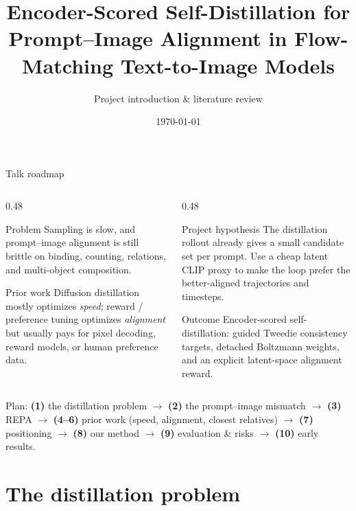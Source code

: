 \documentclass[aspectratio=169,10pt]{beamer}
\title[Encoder-Scored Self-Distillation]{Encoder-Scored Self-Distillation
  for Prompt--Image Alignment in Flow-Matching Text-to-Image Models}
\subtitle{Project introduction \& literature review}
\date{\today}
\begin{document}
\maketitle

\begin{frame}{Talk roadmap}
  \begin{columns}[T]
    \begin{column}{0.48\textwidth}
      \begin{block}{Problem}
        Sampling is slow, and prompt--image alignment is still brittle on
        binding, counting, relations, and multi-object composition.
      \end{block}
      \begin{block}{Prior work}
        Diffusion distillation mostly optimizes \emph{speed}; reward /
        preference tuning optimizes \emph{alignment} but usually pays for
        pixel decoding, reward models, or human preference data.
      \end{block}
    \end{column}
    \begin{column}{0.48\textwidth}
      \begin{alertblock}{Project hypothesis}
        The distillation rollout already gives a small candidate set per
        prompt. Use a cheap latent CLIP proxy to make the loop prefer the
        better-aligned trajectories and timesteps.
      \end{alertblock}
      \begin{block}{Outcome}
        Encoder-scored self-distillation: guided Tweedie consistency targets,
        detached Boltzmann weights, and an explicit latent-space alignment
        reward.
      \end{block}
    \end{column}
  \end{columns}
  \vspace{0.4em}
  {\scriptsize Plan: \textbf{(1)} the distillation problem $\to$
   \textbf{(2)} the prompt--image mismatch $\to$ \textbf{(3)} REPA $\to$
   \textbf{(4--6)} prior work (speed, alignment, closest relatives) $\to$
   \textbf{(7)} positioning $\to$ \textbf{(8)} our method $\to$
   \textbf{(9)} evaluation \& risks $\to$ \textbf{(10)} early results.}
\end{frame}

\section{The distillation problem}
\end{document}
